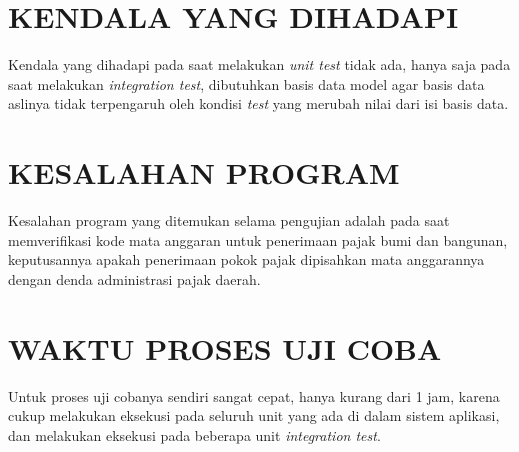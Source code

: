 \documentclass[pdftex,12pt, oneside]{article}
\begin{document}
\section{KENDALA YANG DIHADAPI}

Kendala yang dihadapi pada saat melakukan \textit{unit test} tidak ada, hanya saja pada saat melakukan \textit{integration test}, dibutuhkan basis data model agar basis data aslinya tidak terpengaruh oleh kondisi \textit{test} yang merubah nilai dari isi basis data.


\section{KESALAHAN PROGRAM}

Kesalahan program yang ditemukan selama pengujian adalah pada saat memverifikasi kode mata anggaran untuk penerimaan pajak bumi dan bangunan, keputusannya apakah penerimaan pokok pajak dipisahkan mata anggarannya dengan denda administrasi pajak daerah.


\section{WAKTU PROSES UJI COBA}

Untuk proses uji cobanya sendiri sangat cepat, hanya kurang dari 1 jam, karena cukup melakukan eksekusi pada seluruh unit yang ada di dalam sistem aplikasi, dan melakukan eksekusi pada beberapa unit \textit{integration test}.
\end{document}
